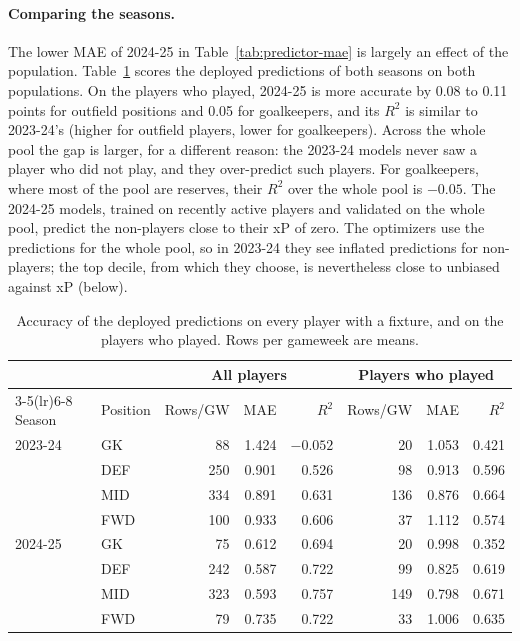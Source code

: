 \documentclass[12pt,oneside,a4paper]{book}
\theoremstyle{definition}
\theoremstyle{remark}
\begin{document}
	\paragraph{Comparing the seasons.} The lower MAE of 2024-25 in Table~\ref{tab:predictor-mae}
	is largely an effect of the population. Table~\ref{tab:predictor-pop} scores the deployed
	predictions of both seasons on both populations. On the players who played, 2024-25 is more
	accurate by 0.08 to 0.11 points for outfield positions and 0.05 for goalkeepers, and its $R^2$
	is similar to 2023-24's (higher for outfield players, lower for goalkeepers). Across the whole
	pool the gap is larger, for a different reason: the 2023-24 models never saw a player who did
	not play, and they over-predict such players. For goalkeepers, where most of the pool are
	reserves, their $R^2$ over the whole pool is $-0.05$. The 2024-25 models, trained on recently
	active players and validated on the whole pool, predict the non-players close to their xP of
	zero. The optimizers use the predictions for the whole pool, so in 2023-24 they see inflated
	predictions for non-players; the top decile, from which they choose, is nevertheless close to
	unbiased against xP (below).

	\begin{table}[ht]
		\centering
		\caption{Accuracy of the deployed predictions on every player with a fixture, and on the
			players who played. Rows per gameweek are means.}
		\label{tab:predictor-pop}
		\small
		\begin{tabular}{llrrrrrr}
			\toprule
			& & \multicolumn{3}{c}{All players} & \multicolumn{3}{c}{Players who played} \\
			\cmidrule(lr){3-5}\cmidrule(lr){6-8}
			Season & Position & Rows/GW & MAE & $R^2$ & Rows/GW & MAE & $R^2$ \\
			\midrule
			2023-24 & GK  &  88 & 1.424 & $-0.052$ &  20 & 1.053 & 0.421 \\
			& DEF & 250 & 0.901 & 0.526    &  98 & 0.913 & 0.596 \\
			& MID & 334 & 0.891 & 0.631    & 136 & 0.876 & 0.664 \\
			& FWD & 100 & 0.933 & 0.606    &  37 & 1.112 & 0.574 \\
			\midrule
			2024-25 & GK  &  75 & 0.612 & 0.694    &  20 & 0.998 & 0.352 \\
			& DEF & 242 & 0.587 & 0.722    &  99 & 0.825 & 0.619 \\
			& MID & 323 & 0.593 & 0.757    & 149 & 0.798 & 0.671 \\
			& FWD &  79 & 0.735 & 0.722    &  33 & 1.006 & 0.635 \\
			\bottomrule
		\end{tabular}
	\end{table}
\end{document}
